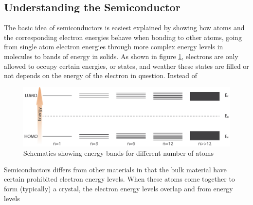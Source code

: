 {\subsection{Understanding the Semiconductor}

The basic idea of semiconductors is easiest explained by showing how atoms and the corresponding electron energies behave when bonding to other atoms, going from single atom electron energies through more complex energy levels in molecules to bands of energy in solids. As shown in figure \ref{fig:energy_bands}, electrons are only allowed to occupy certain energies, or states, and weather these states are filled or not depends on the energy of the electron in question. Instead of 
\begin{figure}[ht!]
\centering
\includegraphics[scale=1]{Figures/Energy_bands1.eps}
\caption{Schematics showing energy bands for different number of atoms}
\label{fig:energy_bands}
\end{figure}

Semiconductors differs from other materials in that the bulk material have certain prohibited electron energy levels. When these atoms come together to form (typically) a crystal, the electron energy levels overlap and from energy levels

}
